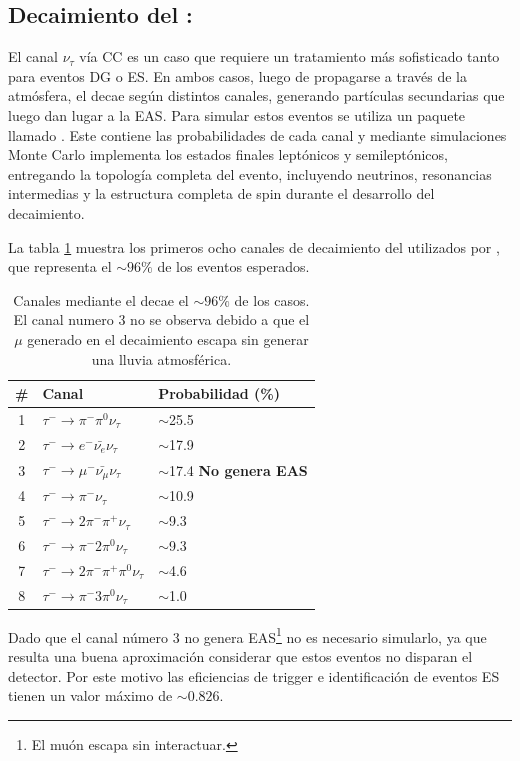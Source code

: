 	
	\subsection{Decaimiento del \tauon{}: \tauola{}}
	\label{sbsc:tauola}
	El canal $\nu_{\tau}$ vía CC es un caso que requiere un tratamiento más sofisticado tanto para eventos DG o ES.
	En ambos casos, luego de propagarse a trav\'es de la atm\'osfera, el \tauon{} decae según distintos canales, generando part\'iculas secundarias que luego dan lugar a la EAS.
	Para simular estos eventos se utiliza un paquete llamado \tauola{}.
	Este contiene las probabilidades de cada canal y mediante simulaciones Monte Carlo implementa los estados finales lept\'onicos y semilept\'onicos, entregando la topolog\'ia completa del evento, incluyendo neutrinos, resonancias intermedias y la estructura completa de spin durante el desarrollo del decaimiento.
	
	La tabla \ref{tab:tauDecay} muestra los primeros ocho canales de decaimiento del \tauon{} utilizados por \tauola{}, que representa el $\sim96\%$ de los eventos esperados.
	\begin{table}[h]
		\begin{center}
		\begin{tabular}{|c|l|l|}
		\hline
		\# &Canal   & Probabilidad (\%) \\
		\hline
		1&$\tau^{-}\rightarrow \pi^{-}\pi^{0}\nu_{\tau}$   & $\sim$25.5 \\
		2&$\tau^{-}\rightarrow e^{-}\bar{\nu_{e}}\nu_{\tau}$   & $\sim$17.9 \\
		3&$\tau^{-}\rightarrow \mu^{-}\bar{\nu_{\mu}}\nu_{\tau}$   & $\sim$17.4 {\bf No genera EAS}\\
		4&$\tau^{-}\rightarrow \pi^{-}\nu_{\tau}$   & $\sim$10.9 \\
		5&$\tau^{-}\rightarrow 2\pi^{-}\pi^{+}\nu_{\tau}$   & $\sim$9.3 \\
		6&$\tau^{-}\rightarrow \pi^{-}2\pi^{0}\nu_{\tau}$   & $\sim$9.3 \\
		7&$\tau^{-}\rightarrow 2\pi^{-}\pi^{+}\pi^{0}\nu_{\tau}$   & $\sim$4.6 \\
		8&$\tau^{-}\rightarrow \pi^{-}3\pi^{0}\nu_{\tau}$   & $\sim$1.0 \\
		\hline
		\end{tabular}
		\end{center}
		\caption{\label{tab:tauDecay}
		Canales mediante el \tauon{} decae el $\sim96\%$ de los casos. El canal numero 3 no se observa debido a que el $\mu$ generado en el decaimiento escapa sin generar una lluvia atmosférica.
		}
	\end{table}
	Dado que el canal número 3 no genera EAS\footnote{El muón escapa sin interactuar.} no es necesario simularlo, ya que resulta una buena aproximaci\'on considerar que estos eventos no disparan el detector.
	Por este motivo las eficiencias de trigger e identificación de eventos ES tienen un valor máximo de $\sim0.826$.
	
